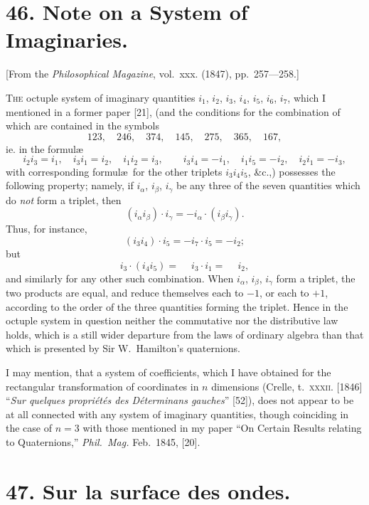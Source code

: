 \documentclass[12pt,a4paper]{article}
\theoremstyle{plain}
\begin{document}
\newpage


\section*{46. Note on a System of Imaginaries.}

[From the \textit{Philosophical Magazine}, vol.~xxx. (1847), pp.~257---258.]

\bigskip

\textsc{The} octuple system of imaginary quantities $i_1$, $i_2$, $i_3$, $i_4$, $i_5$, $i_6$, $i_7$, which I mentioned in a former paper [21], (and the conditions for the combination of which are contained in the symbols
\[
123,\quad 246,\quad 374,\quad 145,\quad 275,\quad 365,\quad 167,
\]
ie. in the formul\ae
\[
i_2 i_3 = i_1,\quad i_3 i_1 = i_2,\quad i_1 i_2 = i_3,\qquad i_3 i_4 = -i_1,\quad i_1 i_5 = -i_2,\quad i_2 i_1 = -i_3,
\]
with corresponding formul\ae\ for the other triplets $i_3 i_4 i_5$, \&c.,) possesses the following property; namely, if $i_\alpha$, $i_\beta$, $i_\gamma$ be any three of the seven quantities which do \textit{not} form a triplet, then
\[
(i_\alpha i_\beta) \cdot i_\gamma = -i_\alpha \cdot (i_\beta i_\gamma).
\]
Thus, for instance,
\[
(i_3 i_4) \cdot i_5 = -i_7 \cdot i_5 = -i_2;
\]
but
\[
i_3 \cdot (i_4 i_5) = \phantom{-}i_3 \cdot i_1 = \phantom{-}i_2,
\]
and similarly for any other such combination. When $i_\alpha$, $i_\beta$, $i_\gamma$ form a triplet, the two products are equal, and reduce themselves each to $-1$, or each to $+1$, according to the order of the three quantities forming the triplet. Hence in the octuple system in question neither the commutative nor the distributive law holds, which is a still wider departure from the laws of ordinary algebra than that which is presented by Sir W.~Hamilton's quaternions.

I may mention, that a system of coefficients, which I have obtained for the rectangular transformation of coordinates in $n$ dimensions (Crelle, t.~\textsc{xxxii}. [1846] ``\textit{Sur quelques propri\'et\'es des D\'eterminans gauches}'' [52]), does not appear to be at all connected with any system of imaginary quantities, though coinciding in the case of $n=3$ with those mentioned in my paper ``On Certain Results relating to Quaternions,'' \textit{Phil.~Mag.} Feb.~1845, [20].

\newpage


\section*{47. Sur la surface des ondes.}
\end{document}
